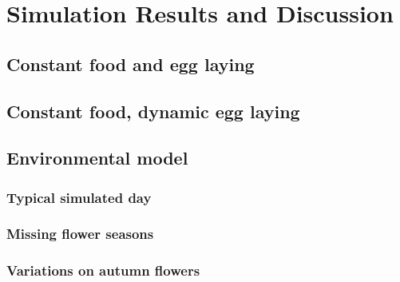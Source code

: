 \section{Simulation Results and Discussion}
\subsection{Constant food and egg laying}
\label{chap:constantFoodConstantLaying}
\subsection{Constant food, dynamic egg laying}
\label{chap:constantFoodDynamicLaying}
\subsection{Environmental model}
	\subsubsection{Typical simulated day}
	
	\subsubsection{Missing flower seasons}
	\subsubsection{Variations on autumn flowers}
